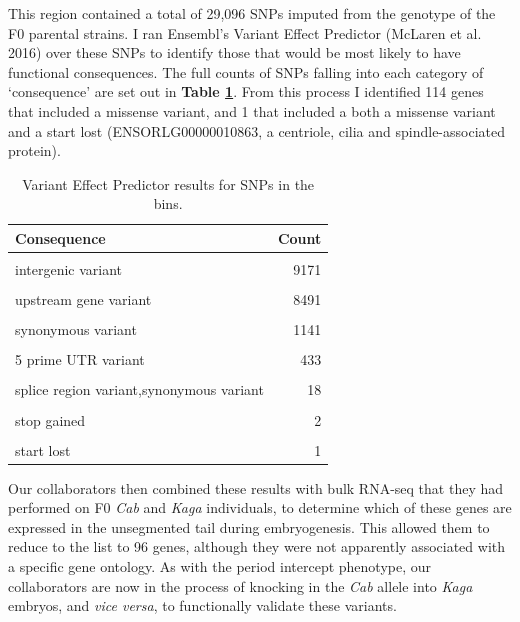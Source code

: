 \documentclass[
]{book}
\begin{document}
This region contained a total of 29,096 SNPs imputed from the genotype of the F0 parental strains.
I ran Ensembl's Variant Effect Predictor (McLaren et al. 2016) over these SNPs to identify those that would be most likely to have functional consequences. The full counts of SNPs falling into each category of `consequence' are set out in \textbf{Table \ref{tab:psm-consequence-tbl}}. From this process I identified 114 genes that included a missense variant, and 1 that included a both a missense variant and a start lost (ENSORLG00000010863, a centriole, cilia and spindle-associated protein).

\begin{table}

\caption{\label{tab:psm-consequence-tbl}Variant Effect Predictor results for SNPs in the bins.}
\centering
\begin{tabular}[t]{lr}
\toprule
Consequence & Count\\
\midrule
\cellcolor{gray!6}{intron variant} & \cellcolor{gray!6}{23189}\\
intergenic variant & 9171\\
\cellcolor{gray!6}{downstream gene variant} & \cellcolor{gray!6}{8894}\\
upstream gene variant & 8491\\
\cellcolor{gray!6}{3 prime UTR variant} & \cellcolor{gray!6}{2104}\\
\addlinespace
synonymous variant & 1141\\
\cellcolor{gray!6}{missense variant} & \cellcolor{gray!6}{716}\\
5 prime UTR variant & 433\\
\cellcolor{gray!6}{splice region variant,intron variant} & \cellcolor{gray!6}{184}\\
splice region variant,synonymous variant & 18\\
\addlinespace
\cellcolor{gray!6}{missense variant,splice region variant} & \cellcolor{gray!6}{7}\\
stop gained & 2\\
\cellcolor{gray!6}{splice donor variant} & \cellcolor{gray!6}{1}\\
start lost & 1\\
\bottomrule
\end{tabular}
\end{table}

Our collaborators then combined these results with bulk RNA-seq that they had performed on F0 \emph{Cab} and \emph{Kaga} individuals, to determine which of these genes are expressed in the unsegmented tail during embryogenesis. This allowed them to reduce to the list to 96 genes, although they were not apparently associated with a specific gene ontology. As with the period intercept phenotype, our collaborators are now in the process of knocking in the \emph{Cab} allele into \emph{Kaga} embryos, and \emph{vice versa}, to functionally validate these variants.
\end{document}
